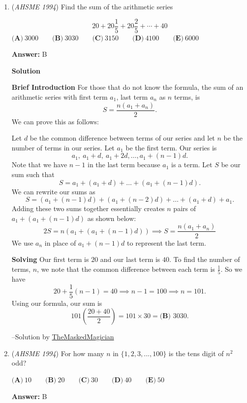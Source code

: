 \begin{enumerate}
 


	\item (\textit{AHSME 1994}) Find the sum of the arithmetic series

 \[20+20\frac{1}{5}+20\frac{2}{5}+\cdots+40\]
$\textbf{(A)}\ 3000 \qquad\textbf{(B)}\ 3030 \qquad\textbf{(C)}\ 3150 \qquad\textbf{(D)}\ 4100 \qquad\textbf{(E)}\ 6000$

 \textbf{Answer: }B



\textbf{Solution}

\textbf{Brief Introduction} For those that do not know the formula, the sum of an arithmetic series with first term $a_1$, last term $a_n$ as $n$ terms, is 
 \[S = \frac{n(a_1+a_n)}{2}.\] We can prove this as follows:

 Let $d$ be the common difference between terms of our series and let $n$ be the number of terms in our series. Let $a_1$ be the first term. Our series is 
 \[a_1,~a_1+d,~a_1+2d,\dots,a_1+(n-1)d.\] Note that we have $n-1$ in the last term because $a_1$ is a term. Let $S$ be our sum such that 
 \[S=a_1+(a_1+d)+\dots+(a_1+(n-1)d).\] We can rewrite our sums as 
 \[S=(a_1+(n-1)d)+(a_1+(n-2)d)+\dots+(a_1+d)+a_1.\] Adding these two sums together essentially creates $n$ pairs of $a_1+(a_1+(n-1)d)$ as shown below: 
 \[2S=n(a_1+(a_1+(n-1)d))\implies S=\frac{n(a_1+a_n)}{2}\] We use $a_n$ in place of $a_1+(n-1)d$ to represent the last term.

 


 \textbf{Solving} Our first term is $20$ and our last term is $40$. To find the number of terms, $n$, we note that the common difference between each term is $\frac{1}{5}$. So we have 
 \[20+\frac{1}{5}(n-1)=40\implies n-1=100\implies n=101.\] Using our formula, our sum is 
 \[101\left(\frac{20+40}{2}\right)=101\times 30=\boxed{\textbf{(B) }3030.}\]

 
--Solution by \href{https://artofproblemsolving.comhttp://www.artofproblemsolving.com/Forum/memberlist.php?mode=viewprofile&u=200685}{TheMaskedMagician}

 


	\item (\textit{AHSME 1994}) For how many $n$ in $\{1, 2, 3, ..., 100 \}$ is the tens digit of $n^2$ odd?


 $\textbf{(A)}\ 10 \qquad\textbf{(B)}\ 20 \qquad\textbf{(C)}\ 30 \qquad\textbf{(D)}\ 40 \qquad\textbf{(E)}\ 50$

 \textbf{Answer: }B




\end{enumerate}
